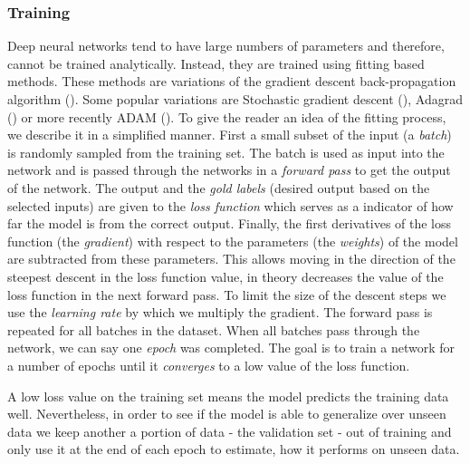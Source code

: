 \subsubsection{Training}
Deep neural networks tend to have large numbers of parameters and therefore, cannot be trained analytically.
Instead, they are trained using fitting based methods.
These methods are variations of the gradient descent back-propagation algorithm (\cite{back-prop}).
Some popular variations are Stochastic gradient descent (\cite{sgd}), Adagrad (\cite{adagrad}) or more recently ADAM (\cite{kingma-adam-2017}).
To give the reader an idea of the fitting process, we describe it in a simplified manner. 
First a small subset of the input (a \textit{batch}) is randomly sampled from the training set. 
The batch is used as input into the network and is passed through the networks in a \textit{forward pass} to get the output of the network. 
The output and the \textit{gold labels} (desired output based on the selected inputs) are given to the \textit{loss function} which serves as a indicator of how far the model is from the correct output. 
Finally, the first derivatives of the loss function (the \textit{gradient}) with respect to the parameters (the \textit{weights}) of the model are subtracted from these parameters.
This allows moving in the direction of the steepest descent in the loss function value, in theory decreases the value of the loss function in the next forward pass.
To limit the size of the descent steps we use the \textit{learning rate} by which we multiply the gradient.
The forward pass is repeated for all batches in the dataset.
When all batches pass through the network, we can say one \textit{epoch} was completed.
The goal is to train a network for a number of epochs until it \textit{converges} to a low value of the loss function.

A low loss value on the training set means the model predicts the training data well.
Nevertheless, in order to see if the model is able to generalize over unseen data we keep another a portion of data - the validation set - out of training and only use it at the end of each epoch to estimate, how it performs on unseen data. 

